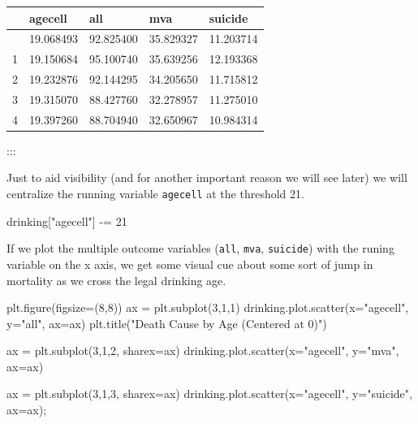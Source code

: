 \documentclass[
  letterpaper,
  DIV=11,
  numbers=noendperiod]{scrreprt}
\newenvironment{Shaded}{\begin{snugshade}}{\end{snugshade}}
\newcommand{\DecValTok}[1]{\textcolor[rgb]{0.68,0.00,0.00}{#1}}
\newcommand{\NormalTok}[1]{\textcolor[rgb]{0.00,0.23,0.31}{#1}}
\newcommand{\OperatorTok}[1]{\textcolor[rgb]{0.37,0.37,0.37}{#1}}
\newcommand{\StringTok}[1]{\textcolor[rgb]{0.13,0.47,0.30}{#1}}
\begin{document}
\begin{longtable}[]{@{}lllll@{}}
\toprule\noalign{}
& agecell & all & mva & suicide \\
\midrule\noalign{}
\endhead
\bottomrule\noalign{}
\endlastfoot
0 & 19.068493 & 92.825400 & 35.829327 & 11.203714 \\
1 & 19.150684 & 95.100740 & 35.639256 & 12.193368 \\
2 & 19.232876 & 92.144295 & 34.205650 & 11.715812 \\
3 & 19.315070 & 88.427760 & 32.278957 & 11.275010 \\
4 & 19.397260 & 88.704940 & 32.650967 & 10.984314 \\
\end{longtable}

:::

Just to aid visibility (and for another important reason we will see
later) we will centralize the running variable \texttt{agecell} at the
threshold 21.

\begin{Shaded}
\begin{Highlighting}[]
\NormalTok{drinking[}\StringTok{"agecell"}\NormalTok{] }\OperatorTok{{-}=} \DecValTok{21}
\end{Highlighting}
\end{Shaded}

If we plot the multiple outcome variables (\texttt{all}, \texttt{mva},
\texttt{suicide}) with the runing variable on the x axis, we get some
visual cue about some sort of jump in mortality as we cross the legal
drinking age.

\begin{Shaded}
\begin{Highlighting}[]
\NormalTok{plt.figure(figsize}\OperatorTok{=}\NormalTok{(}\DecValTok{8}\NormalTok{,}\DecValTok{8}\NormalTok{))}
\NormalTok{ax }\OperatorTok{=}\NormalTok{ plt.subplot(}\DecValTok{3}\NormalTok{,}\DecValTok{1}\NormalTok{,}\DecValTok{1}\NormalTok{)}
\NormalTok{drinking.plot.scatter(x}\OperatorTok{=}\StringTok{"agecell"}\NormalTok{, y}\OperatorTok{=}\StringTok{"all"}\NormalTok{, ax}\OperatorTok{=}\NormalTok{ax)}
\NormalTok{plt.title(}\StringTok{"Death Cause by Age (Centered at 0)"}\NormalTok{)}

\NormalTok{ax }\OperatorTok{=}\NormalTok{ plt.subplot(}\DecValTok{3}\NormalTok{,}\DecValTok{1}\NormalTok{,}\DecValTok{2}\NormalTok{, sharex}\OperatorTok{=}\NormalTok{ax)}
\NormalTok{drinking.plot.scatter(x}\OperatorTok{=}\StringTok{"agecell"}\NormalTok{, y}\OperatorTok{=}\StringTok{"mva"}\NormalTok{, ax}\OperatorTok{=}\NormalTok{ax)}

\NormalTok{ax }\OperatorTok{=}\NormalTok{ plt.subplot(}\DecValTok{3}\NormalTok{,}\DecValTok{1}\NormalTok{,}\DecValTok{3}\NormalTok{, sharex}\OperatorTok{=}\NormalTok{ax)}
\NormalTok{drinking.plot.scatter(x}\OperatorTok{=}\StringTok{"agecell"}\NormalTok{, y}\OperatorTok{=}\StringTok{"suicide"}\NormalTok{, ax}\OperatorTok{=}\NormalTok{ax)}\OperatorTok{;}
\end{Highlighting}
\end{Shaded}
\end{document}
